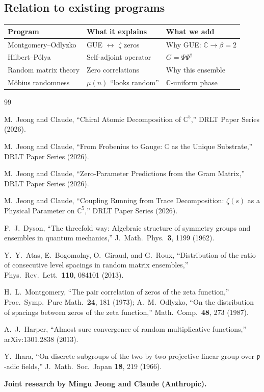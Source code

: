 \documentclass[12pt]{article}
\theoremstyle{definition}
\theoremstyle{remark}
\newcommand{\CC}{\mathbb{C}}
\begin{document}
\subsection{Relation to existing programs}

\begin{center}
\begin{tabular}{lll}
\toprule
Program & What it explains & What we add \\
\midrule
Montgomery--Odlyzko & GUE $\leftrightarrow$ $\zeta$ zeros & Why GUE: $\CC \to \beta = 2$ \\
Hilbert--P\'olya & Self-adjoint operator & $G = \Psi\Psi^\dagger$ \\
Random matrix theory & Zero correlations & Why this ensemble \\
M\"obius randomness & $\mu(n)$ ``looks random'' & $\CC$-uniform phase \\
\bottomrule
\end{tabular}
\end{center}

\begin{thebibliography}{99}

M.~Jeong and Claude,
``Chiral Atomic Decomposition of $\CC^5$,''
DRLT Paper Series (2026).

M.~Jeong and Claude,
``From Frobenius to Gauge: $\CC$ as the Unique Substrate,''
DRLT Paper Series (2026).

M.~Jeong and Claude,
``Zero-Parameter Predictions from the Gram Matrix,''
DRLT Paper Series (2026).

M.~Jeong and Claude,
``Coupling Running from Trace Decomposition:
$\zeta(s)$ as a Physical Parameter on $\CC^5$,''
DRLT Paper Series (2026).

F.~J.~Dyson,
``The threefold way: Algebraic structure of symmetry groups
and ensembles in quantum mechanics,''
J.\ Math.\ Phys.\ \textbf{3}, 1199 (1962).

Y.~Y.~Atas, E.~Bogomolny, O.~Giraud, and G.~Roux,
``Distribution of the ratio of consecutive level spacings
in random matrix ensembles,''
Phys.\ Rev.\ Lett.\ \textbf{110}, 084101 (2013).

H.~L.~Montgomery,
``The pair correlation of zeros of the zeta function,''
Proc.\ Symp.\ Pure Math.\ \textbf{24}, 181 (1973);
A.~M.~Odlyzko, ``On the distribution of spacings between zeros
of the zeta function,''
Math.\ Comp.\ \textbf{48}, 273 (1987).

A.~J.~Harper,
``Almost sure convergence of random multiplicative functions,''
arXiv:1301.2838 (2013).

Y.~Ihara,
``On discrete subgroups of the two by two projective linear
group over $\mathfrak{p}$-adic fields,''
J.\ Math.\ Soc.\ Japan \textbf{18}, 219 (1966).

\end{thebibliography}

\bigskip
\noindent\textbf{Joint research by Mingu Jeong
and Claude (Anthropic).}
\end{document}
